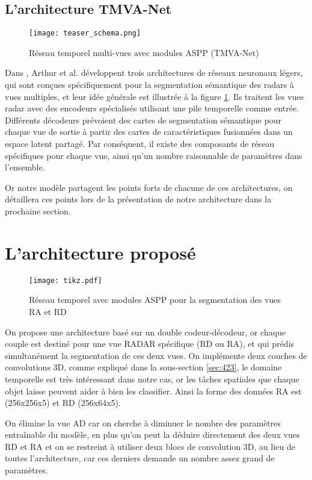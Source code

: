 \subsection{L'architecture TMVA-Net}
\begin{figure}[hbt!]
  \centering
  \texttt{[image: teaser\_schema.png]}
  \caption{Réseau temporel multi-vues avec modules ASPP (TMVA-Net) \cite{50} }
  \label{fig:46}
\end{figure}
Dans \cite{50}, Arthur et al. développent trois architectures de réseaux neuronaux légers, qui sont conçues spécifiquement pour la segmentation sémantique des radars à vues multiples, et leur idée générale est illustrée à la figure \ref{fig:46}. Ils traitent les vues radar avec des encodeurs spécialisés utilisant une pile temporelle comme entrée. 
Différents décodeurs prévoient des cartes de segmentation sémantique pour chaque vue de sortie à partir des cartes de caractéristiques fusionnées dans un espace latent partagé.
Par conséquent, il existe des composants de réseau spécifiques pour chaque vue, ainsi qu'un nombre raisonnable de paramètres dans l'ensemble.

Or notre modèle partagent les points forts de chacune de ces architectures, on détaillera ces points lors de la présentation de notre architecture dans la prochaine section.

\section{L'architecture proposé}
\begin{figure}[hbt!]
  \centering
  \texttt{[image: tikz.pdf]}
  \caption{Réseau temporel avec modules ASPP pour la segmentation des vues RA et RD}
  \label{fig:your_label}
  \end{figure}
On propose une architecture basé sur un double codeur-décodeur, or chaque couple est destiné pour une vue RADAR spécifique (RD ou RA), et qui prédis simultanément la segmentation de ces deux vues. On implémente deux couches de convolutions 3D, comme expliqué dans la sous-section \ref{sec:423}, le domaine temporelle est très intéressant dans notre cas, or les tâches spatiales que chaque objet laisse peuvent aider à bien les classifier. Ainsi la forme des données RA est (256x256x5) et RD (256x64x5).

On élimine la vue AD car on cherche à diminuer le nombre des paramètres entraînable du modèle, en plus qu'on peut la déduire directement des deux vues RD et RA et on se restreint à utiliser deux blocs de convolution 3D, au lieu de toutes l'architecture, car ces derniers demande un nombre assez grand de paramètres.

